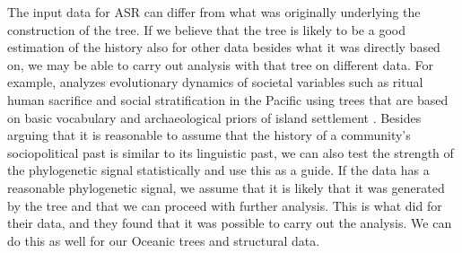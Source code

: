 \documentclass[12pt,letterpaper]{article}
\begin{document}
The input data for ASR can differ from what was originally underlying the construction of the tree. If we believe that the tree is likely to be a good estimation of the history also for other data besides what it was directly based on, we may be able to carry out analysis with that tree on different data. For example, \citet{watts2016ritual} analyzes evolutionary dynamics of societal variables such as ritual human sacrifice and social stratification in the Pacific using trees that are based on basic vocabulary and archaeological priors of island settlement \citep{grayetal_2009}. Besides arguing that it is reasonable to assume that the history of a community's sociopolitical past is similar to its linguistic past, we can also test the strength of the phylogenetic signal statistically and use this as a guide. If the data has a reasonable phylogenetic signal, we assume that it is likely that it was generated by the tree and that we can proceed with further analysis. This is what \citet{watts2016ritual} did for their data, and they found that it was possible to carry out the analysis. We can do this as well for our Oceanic trees and structural data.


\end{document}
